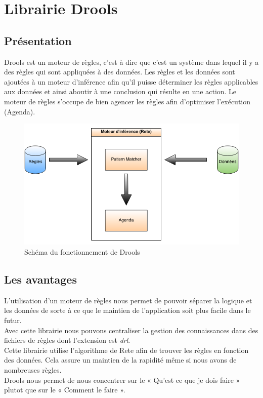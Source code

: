 	\section{Librairie Drools}

		\subsection{Présentation}
			Drools est un moteur de règles, c'est à dire que c'est un système dans lequel il y a des règles qui sont appliquées à des données. 
			Les règles et les données sont ajoutées	à un moteur d'inférence afin qu'il puisse déterminer les règles applicables aux données et ainsi aboutir à une conclusion qui résulte en une action.
			Le moteur de règles s'occupe de bien agencer les règles afin d'optimiser l'exécution (Agenda).

		
			\begin{figure}[!h]
			    \caption{Schéma du fonctionnement de Drools}
			    \centerline{\includegraphics[scale=0.7]{images/architecture/drools_schema.png}}
			\end{figure}


		\subsection{Les avantages}
			L'utilisation d'un moteur de règles nous permet de pouvoir séparer la logique et les données de sorte à ce que le maintien de l'application soit plus facile dans le futur.
			\\
			Avec cette librairie nous pouvons centraliser la gestion des connaissances dans des fichiers de règles dont l'extension est {\itshape drl}.
			\\
			Cette librairie utilise l'algorithme de Rete afin de trouver les règles en fonction des données. Cela assure un maintien de la rapidité même si nous avons de nombreuses règles.
			\\
			Drools nous permet de nous concentrer sur le « Qu'est ce que je dois faire » plutot que sur le « Comment le faire ».


